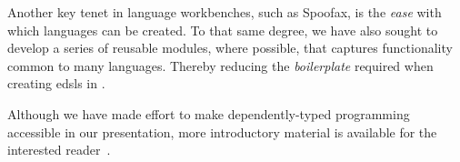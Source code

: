 Another key tenet in language workbenches, such as Spoofax, is the \emph{ease} with which languages can be created.
%
To that same degree, we have also sought to develop a series of reusable modules, where possible, that captures functionality common to many languages.
%
Thereby reducing the \emph{boilerplate} required when creating \acp{edsl} in \Idris{}.

Although we have made effort to make dependently-typed programming accessible in our presentation, more introductory material is available for the interested reader~\cite{plfa22.08,brady17:_type_driven_devel_idris}.


